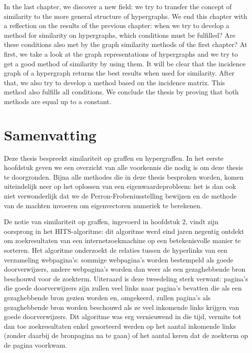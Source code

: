 \documentclass[a4paper,11pt]{report}
\begin{document}
In the last chapter, we discover a new field: we try to transfer the concept of similarity to the more
general structure of hypergraphs. We end this chapter with a reflection on the results of the previous chapter:
when we try to develop a method for similarity on hypergraphs, which conditions must be fulfilled? Are these conditions
also met by the graph similarity methods of the first chapter? At first, we take a look at the graph 
representations of hypergraphs and we try to get a good method of similarity by 
using them. It will be clear that the incidence graph of a 
hypergraph returns the best results when used for similarity. After that, we 
also try to develop a method based on the incidence matrix. This method also fulfills all conditions. We conclude the 
thesis by proving that both methods are equal up to a constant.



\chapter*{Samenvatting}
Deze thesis bespreekt similariteit op graffen en hypergraffen. In het eerste 
hoofdstuk geven we een overzicht van alle voorkennis die nodig is om deze thesis 
te doorgronden. Bijna alle methodes die in deze thesis besproken worden, komen 
uiteindelijk neer op het oplossen van een eigenwaardeprobleem: het is dan ook 
niet verwonderlijk dat we de Perron-Frobeniusstelling bewijzen en de methode van 
de machten invoeren om eigenvectoren numeriek te berekenen.


De notie van 
similariteit op graffen, ingevoerd in hoofdstuk 2, vindt zijn oorsprong in het HITS-algoritme: dit algoritme 
werd eind jaren negentig ontdekt om zoekresultaten van een internetzoekmachine op een betekenisvolle manier 
te sorteren. Het algoritme onderzoekt de relaties tussen de hyperlinks van een verzameling webpagina's: sommige webpagina's worden 
bestempeld als goede doorverwijzers, andere webpagina's worden dan weer als een gezaghebbende bron beschouwd voor de zoekterm. 
Uiteraard is deze tweedeling sterk verwant: pagina's die goede doorverwijzers 
zijn zullen veel links naar pagina's bevatten die als een gezaghebbende bron 
gezien worden en, omgekeerd, zullen pagina's als gezaghebbende bron worden 
beschouwd als ze veel inkomende links krijgen van goede doorverwijzers. Dit 
algoritme was erg vernieuwend in die tijd, vermits tot dan toe zoekresultaten 
enkel gesorteerd werden op het aantal inkomende links (zonder daarbij de bronpagina na te gaan) 
of het aantal keren dat de zoekterm op de pagina voorkwam.
\end{document}
